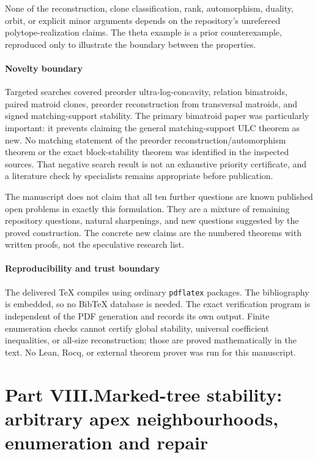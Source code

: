 \documentclass[11pt]{article}
\numberwithin{equation}{section}
\theoremstyle{definition}
\begin{document}
None of the reconstruction, clone classification, rank, automorphism,
duality, orbit, or explicit minor arguments depends on the repository's
unrefereed polytope-realization claims. The theta example is a prior
counterexample, reproduced only to illustrate the boundary between the
properties.

\subsection{Novelty boundary}
Targeted searches covered preorder ultra-log-concavity, relation
bimatroids, paired matroid clones, preorder reconstruction from transversal
matroids, and signed matching-support stability. The primary bimatroid
paper was particularly important: it prevents claiming the general
matching-support ULC theorem as new. No matching statement of the
preorder reconstruction/automorphism theorem or the exact block-stability
theorem was identified in the inspected sources. That negative search
result is not an exhaustive priority certificate, and a literature check
by specialists remains appropriate before publication.

The manuscript does not claim that all ten further questions are known
published open problems in exactly this formulation. They are a mixture
of remaining repository questions, natural sharpenings, and new questions
suggested by the proved construction. The concrete new claims are the
numbered theorems with written proofs, not the speculative research list.

\subsection{Reproducibility and trust boundary}
The delivered TeX compiles using ordinary \texttt{pdflatex} packages. The
bibliography is embedded, so no BibTeX database is needed. The exact
verification program is independent of the PDF generation and records
its own output. Finite enumeration checks cannot certify global stability,
universal coefficient inequalities, or all-size reconstruction; those are
proved mathematically in the text. No Lean, Rocq, or external theorem
prover was run for this manuscript.

\clearpage

\clearpage
{}\part*{Part VIII.\quad Marked-tree stability: arbitrary apex neighbourhoods, enumeration and repair}
\end{document}
